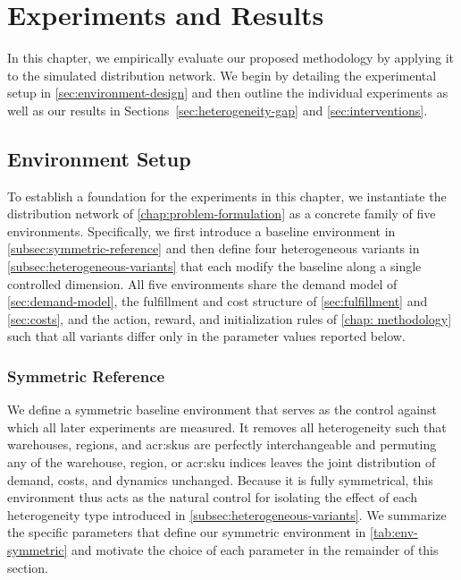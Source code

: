 \chapter{Experiments and Results}
\label{chap:experiment-results}

In this chapter, we empirically evaluate our proposed methodology by applying it to the simulated distribution network. We begin by detailing the experimental setup in \autoref{sec:environment-design} and then outline the individual experiments as well as our results in Sections~\ref{sec:heterogeneity-gap} and  \ref{sec:interventions}.\\

\section{Environment Setup}
\label{sec:environment-design}
To establish a foundation for the experiments in this chapter, we instantiate the distribution network of \autoref{chap:problem-formulation} as a concrete family of five environments. Specifically, we first introduce a baseline environment in \autoref{subsec:symmetric-reference} and then define four heterogeneous variants in \autoref{subsec:heterogeneous-variants} that each modify the baseline along a single controlled dimension. All five environments share the demand model of \autoref{sec:demand-model}, the fulfillment and cost structure of \autoref{sec:fulfillment} and \autoref{sec:costs}, and the action, reward, and initialization rules of \autoref{chap: methodology} such that all variants differ only in the parameter values reported below.\\

\subsection{Symmetric Reference}
\label{subsec:symmetric-reference}
We define a symmetric baseline environment that serves as the control against which all later experiments are measured. It removes all heterogeneity such that warehouses, regions, and \glspl{acr:sku} are perfectly interchangeable and permuting any of the warehouse, region, or \gls{acr:sku} indices leaves the joint distribution of demand, costs, and dynamics unchanged. Because it is fully symmetrical, this environment thus acts as the natural control for isolating the effect of each heterogeneity type introduced in \autoref{subsec:heterogeneous-variants}. We summarize the specific parameters that define our symmetric environment in \autoref{tab:env-symmetric} and motivate the choice of each parameter in the remainder of this section.



